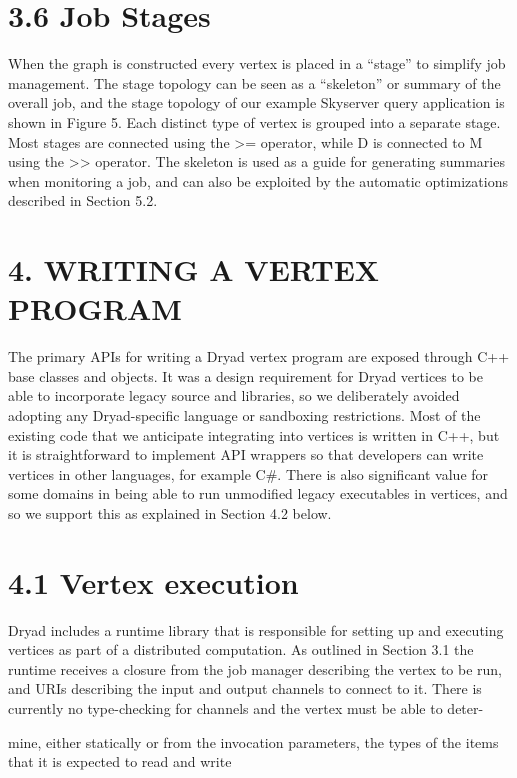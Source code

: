 \documentclass[
]{article}
\begin{document}
\section{3.6 Job Stages}\label{job-stages}

When the graph is constructed every vertex is placed in a ``stage'' to
simplify job management. The stage topology can be seen as a
``skeleton'' or summary of the overall job, and the stage topology of
our example Skyserver query application is shown in Figure 5. Each
distinct type of vertex is grouped into a separate stage. Most stages
are connected using the \textgreater= operator, while D is connected to
M using the \textgreater\textgreater{} operator. The skeleton is used as
a guide for generating summaries when monitoring a job, and can also be
exploited by the automatic optimizations described in Section 5.2.

\section{4. WRITING A VERTEX PROGRAM}\label{writing-a-vertex-program}

The primary APIs for writing a Dryad vertex program are exposed through
C++ base classes and objects. It was a design requirement for Dryad
vertices to be able to incorporate legacy source and libraries, so we
deliberately avoided adopting any Dryad-specific language or sandboxing
restrictions. Most of the existing code that we anticipate integrating
into vertices is written in C++, but it is straightforward to implement
API wrappers so that developers can write vertices in other languages,
for example C\#. There is also significant value for some domains in
being able to run unmodified legacy executables in vertices, and so we
support this as explained in Section 4.2 below.

\section{4.1 Vertex execution}\label{vertex-execution}

Dryad includes a runtime library that is responsible for setting up and
executing vertices as part of a distributed computation. As outlined in
Section 3.1 the runtime receives a closure from the job manager
describing the vertex to be run, and URIs describing the input and
output channels to connect to it. There is currently no type-checking
for channels and the vertex must be able to deter-

mine, either statically or from the invocation parameters, the types of
the items that it is expected to read and write
\end{document}
